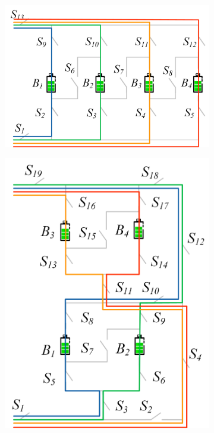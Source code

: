 \documentclass{article}
\begin{document}
\begin{figure}[htbp]
\begin{subfigure}[b]{0.2\textwidth}
        \caption{}
        \label{fig:e4-sp}
    \end{subfigure}
    \hspace{0.02\textwidth}
    \begin{subfigure}[b]{0.4\textwidth}
        \includegraphics[width=\textwidth]{f4-sp.png}
        \caption{}
        \label{fig:f4-sp}
    \end{subfigure}
    \hspace{0.02\textwidth}
    \begin{subfigure}[b]{0.31\textwidth}
        \includegraphics[width=\textwidth]{e2f2-sp.png}

\end{subfigure}
\end{figure}
\end{document}

